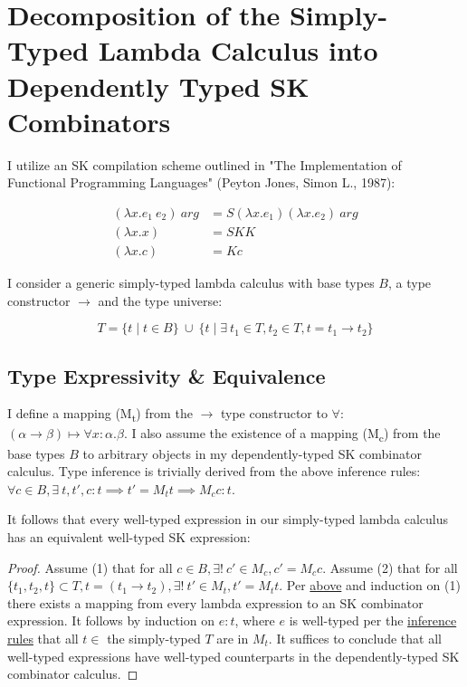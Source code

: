 \documentclass[11pt]{article}
\begin{document}
\label{decomplemma:1}
\section{Decomposition of the Simply-Typed Lambda Calculus into Dependently Typed SK Combinators}
\label{sec:orge983206}

I utilize an SK compilation scheme outlined in "The Implementation of Functional Programming Languages" (Peyton Jones, Simon L., 1987):

\begin{align}
(\lambda x.e_{1}\ e_{2})\ arg &= S (\lambda x.e_{1}) (\lambda x.e_{2})\ arg \\
(\lambda x.x) &= SKK \\
(\lambda x.c) &= K c
\end{align}

I consider a generic simply-typed lambda calculus with base types \(B\), a type constructor \(\rightarrow\) and the type universe:

\[
T = \{ t \mid t \in B\}\ \cup\ \{ t \mid \exists\  t_{1} \in T, t_{2} \in T, t = t_{1} \rightarrow t_{2} \}
\]

\label{maplemma:1}
\subsection{Type Expressivity \& Equivalence}
\label{sec:orgcffba5b}

I define a mapping (M\textsubscript{t}) from the \(\rightarrow\) type constructor to \(\forall\): \((\alpha \rightarrow \beta) \mapsto \forall x : \alpha.\beta\). I also assume the existence of a mapping (M\textsubscript{c}) from the base types \(B\) to arbitrary objects in my dependently-typed SK combinator calculus. Type inference is trivially derived from the above inference rules: \(\forall c \in B, \exists\ t, t', c : t \implies t' = M_{t} t \implies M_{c} c : t\).

It follows that every well-typed expression in our simply-typed lambda calculus has an equivalent well-typed SK expression:

\begin{proof}
Assume (1) that for all $c \in B, \exists!\ c' \in M_{c}, c' = M_{c} c$.
Assume (2) that for all $\{t_{1}, t_{2}, t\} \subset T, t = (t_{1} \rightarrow t_{2}), \exists!\ t' \in M_{t}, t' = M_{t} t$.
Per \href{decomplemma:1}{above} and induction on (1) there exists a mapping from every lambda expression to an SK combinator expression.
It follows by induction on $e : t$, where $e$ is well-typed per the \href{decomplemma:1}{inference rules} that all $t \in$ the simply-typed $T$ are in $M_{t}$.
It suffices to conclude that all well-typed expressions have well-typed counterparts in the dependently-typed SK combinator calculus.
\end{proof}
\end{document}
